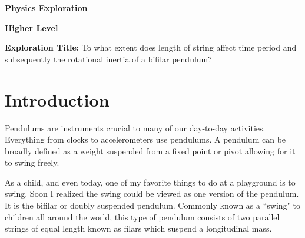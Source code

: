 \documentclass[a4paper,12pt]{article}
\theoremstyle{definition}
\begin{document}
\begin{titlepage}
    \begin{center}
    
        \vspace*{0.2cm}
 
        \Large
        \textbf{Physics Exploration}
        
 		\textbf{Higher Level}

        

        \vspace{2.5cm}
		
		
		\textbf{Exploration Title: }To what extent does length of string %
		 affect time period  and subsequently the rotational inertia of a bifilar pendulum?
 
        \vfill
 
 
        \vspace{0.8cm}

 
    \end{center}
\end{titlepage}





\section{Introduction}
Pendulums are instruments crucial to many of our day-to-day activities. Everything from clocks to accelerometers use pendulums. A pendulum can be broadly defined as a weight suspended from a fixed point or pivot allowing for it to swing freely.

As a child, and even today, one of my favorite things to do at a playground is to swing. Soon I realized the swing could be viewed as one version of the pendulum. It is the bifilar or doubly suspended pendulum. Commonly known as a ``swing" to children all around the world, this type of pendulum consists of two parallel strings of equal length known as filars which suspend a longitudinal mass. 
\end{document}
